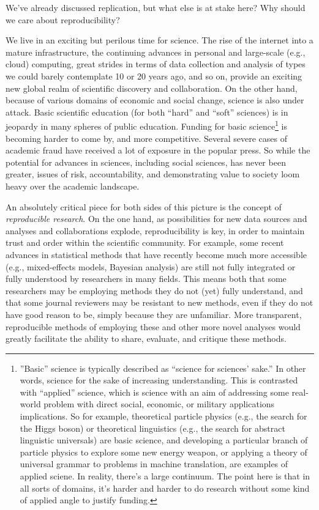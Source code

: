 \documentclass{book}
\begin{document}
We've already discussed replication, but what else is at stake here? Why should we care about reproducibility?


We live in an exciting but perilous time for science. The rise of the internet into a mature infrastructure, the continuing advances in personal and large-scale (e.g., cloud) computing, great strides in terms of data collection and analysis of types we could barely contemplate 10 or 20 years ago, and so on, provide an exciting new global realm of scientific discovery and collaboration. On the other hand, because of various domains of economic and social change, science is also under attack.  Basic scientific education (for both ``hard'' and ``soft'' sciences) is in jeopardy in many spheres of public education.  Funding for basic science\footnote{''Basic'' science is typically described as ``science for sciences' sake.'' In other words, science for the sake of increasing understanding. This is contrasted with ``applied'' science, which is science with an aim of addressing some real-world problem with direct social, economic, or military applications implications. So for example, theoretical particle physics (e.g., the search for the Higgs boson) or theoretical linguistics (e.g., the search for abstract linguistic universals) are basic science, and developing a particular branch of particle physics to explore some new energy weapon, or applying a theory of universal grammar to problems in machine translation, are examples of applied sciene. In reality, there's a large continuum. The point here is that in all sorts of domains, it's harder and harder to do research without some kind of applied angle to justify funding.
 } is becoming harder to come by, and more competitive.  Several severe cases of academic fraud have received a lot of exposure in the popular press. So while the potential for advances in sciences, including social sciences, has never been greater, issues of risk, accountability, and demonstrating value to society loom heavy over the academic landscape.

An absolutely critical piece for both sides of this picture is the concept of \emph{reproducible research}.  On the one hand, as possibilities for new data sources and analyses and collaborations explode, reproducibility is key, in order to maintain trust and order within the scientific community.  For example, some recent advances in statistical methods that have recently become much more accessible (e.g., mixed-effects models, Bayesian analysis) are still not fully integrated or fully understood by researchers in many fields.  This means both that some researchers may be employing methods they do not (yet) fully understand, and that some journal reviewers may be resistant to new methods, even if they do not have good reason to be, simply because they are unfamiliar. More transparent, reproducible methods of employing these and other more novel analyses would greatly facilitate the ability to share, evaluate, and critique these methods.
\end{document}
